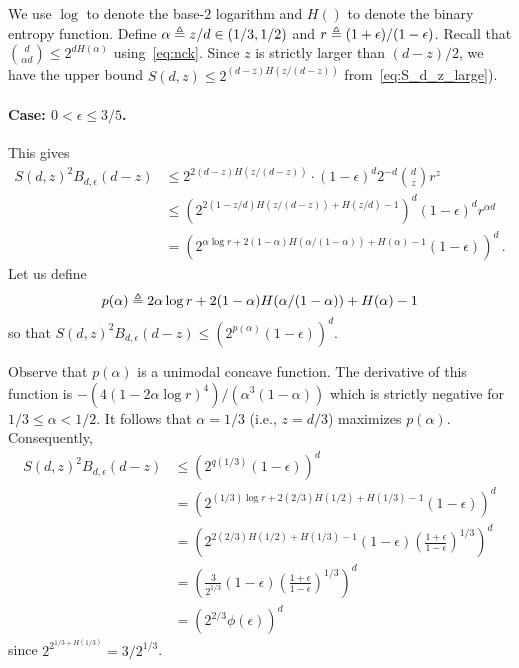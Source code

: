 
  We use $\log$ to denote the base-$2$ logarithm and $H()$ to denote the binary entropy function. 
  Define $\alpha \triangleq z/d \in (1/3, 1/2)$ and $r \triangleq (1+\epsilon)/(1-\epsilon)$.
  Recall that $\binom{d}{\alpha d} \leq 2^{d H(\alpha)}$ using~\eqref{eq:nck}.
  Since $z$ is strictly larger than $(d - z)/2$, 
  we have the upper bound $S(d,z) \leq 2^{(d-z)H(z/(d-z))}$ from~\eqref{eq:S_d_z_large}). %


  \paragraph{Case: $0 < \epsilon \leq 3/5$.} 
  This gives
  \begin{align*}
  S(d, z)^2 B_{d,\epsilon}(d-z) 
  &\leq 2^{2(d-z)H(z/(d-z))} \cdot (1-\epsilon)^d 2^{-d} {d \choose z}  r^{z} \\
  &\leq \left( 2^{2(1-z/d)H(z/(d-z)) + H(z/d) - 1} \right)^d (1-\epsilon)^d r^{\alpha d} \\
   &= \left( 2^{ \alpha \log r + 2(1-\alpha)H(\alpha/(1 - \alpha)) + H(\alpha) - 1} (1-\epsilon) \right)^d 
  \,.
  \end{align*}
  Let us define 
  \[
      p(\alpha) \triangleq 2 \alpha \log r + 2(1-\alpha)H(\alpha/(1 - \alpha)) + H(\alpha) - 1 
  \]
  so that 
  $
      S(d, z)^2 B_{d,\epsilon}(d-z) \leq \left(2^{p(\alpha)} (1-\epsilon) \right)^d
  $.

  Observe that $p(\alpha)$ is a unimodal concave function. 
  The derivative of this function is
  $
      -\left(4(1-2\alpha \log r)^4\right)/\left(\alpha^3(1-\alpha) \right)
  $
  which is strictly negative for $1/3 \leq \alpha < 1/2$. 
  It follows that $\alpha = 1/3$ (i.e., $z = d/3$) maximizes $p(\alpha)$. 
  Consequently,
  \begin{align*}
  S(d, z)^2 B_{d,\epsilon}(d-z)
  &\leq \left(2^{q(1/3)} (1-\epsilon) \right)^d \\
  &= \left( 2^{(1/3)\log r + 2(2/3)H(1/2) + H(1/3) - 1}  (1-\epsilon) \right)^d \\
  &= \left( 2^{2(2/3)H(1/2) + H(1/3) - 1}  (1-\epsilon)
   \left(\frac{1+\epsilon}{1-\epsilon}\right)^{1/3} \right)^d \\
  &= \left( \frac{3}{2^{1/3}}  (1-\epsilon)
   \left(\frac{1+\epsilon}{1-\epsilon}\right)^{1/3} \right)^d \\
   &= \left(2^{2/3} \phi(\epsilon) \right)^d 
  \end{align*}
  since $2^{2^{1/3 + H(1/3)}} = 3/2^{1/3}$.

